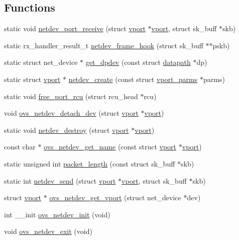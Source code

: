 \subsection*{Functions}
\begin{DoxyCompactItemize}
\item 
static void \hyperlink{vport-netdev_8c_a203ef31e44d24cc73b6fd99ff15973ae}{netdev\+\_\+port\+\_\+receive} (struct \hyperlink{structvport}{vport} $\ast$\hyperlink{structvport}{vport}, struct sk\+\_\+buff $\ast$skb)
\item 
static rx\+\_\+handler\+\_\+result\+\_\+t \hyperlink{vport-netdev_8c_a4c69c350d93bf290fea2ff1e9759311d}{netdev\+\_\+frame\+\_\+hook} (struct sk\+\_\+buff $\ast$$\ast$pskb)
\item 
static struct net\+\_\+device $\ast$ \hyperlink{vport-netdev_8c_ae407cdb3541e622199306fa8e2e6cd92}{get\+\_\+dpdev} (const struct \hyperlink{structdatapath}{datapath} $\ast$dp)
\item 
static struct \hyperlink{structvport}{vport} $\ast$ \hyperlink{vport-netdev_8c_ae347c95fee1fc936f726d57cce0541f4}{netdev\+\_\+create} (const struct \hyperlink{structvport__parms}{vport\+\_\+parms} $\ast$parms)
\item 
static void \hyperlink{vport-netdev_8c_a3b01c780c7673ecd1fcb517bb4fef97f}{free\+\_\+port\+\_\+rcu} (struct rcu\+\_\+head $\ast$rcu)
\item 
void \hyperlink{vport-netdev_8c_ac03887d6d37218f96766a4fe8a29a7f6}{ovs\+\_\+netdev\+\_\+detach\+\_\+dev} (struct \hyperlink{structvport}{vport} $\ast$\hyperlink{structvport}{vport})
\item 
static void \hyperlink{vport-netdev_8c_a159283a11e7da94bc5e76ca2a2f6ceaa}{netdev\+\_\+destroy} (struct \hyperlink{structvport}{vport} $\ast$\hyperlink{structvport}{vport})
\item 
const char $\ast$ \hyperlink{vport-netdev_8c_a63439e8a15ca15f649e7cd4c26a79437}{ovs\+\_\+netdev\+\_\+get\+\_\+name} (const struct \hyperlink{structvport}{vport} $\ast$\hyperlink{structvport}{vport})
\item 
static unsigned int \hyperlink{vport-netdev_8c_a9f2be5b32b1c210d157335d49a1c958b}{packet\+\_\+length} (const struct sk\+\_\+buff $\ast$skb)
\item 
static int \hyperlink{vport-netdev_8c_a8fde99ce838cbc4e5b5f7c4ccaf07104}{netdev\+\_\+send} (struct \hyperlink{structvport}{vport} $\ast$\hyperlink{structvport}{vport}, struct sk\+\_\+buff $\ast$skb)
\item 
struct \hyperlink{structvport}{vport} $\ast$ \hyperlink{vport-netdev_8c_adf074c6126d43c3f7ea008ac19d33112}{ovs\+\_\+netdev\+\_\+get\+\_\+vport} (struct net\+\_\+device $\ast$dev)
\item 
int \+\_\+\+\_\+init \hyperlink{vport-netdev_8c_a70dd93833f5d471ed3951dd80f54a914}{ovs\+\_\+netdev\+\_\+init} (void)
\item 
void \hyperlink{vport-netdev_8c_ada5333ba6a30c7b472582687565e316c}{ovs\+\_\+netdev\+\_\+exit} (void)
\end{DoxyCompactItemize}
